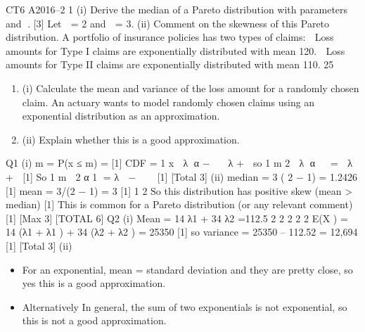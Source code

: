 \documentclass[a4paper,12pt]{article}
\begin{document}
CT6 A2016–2
1 (i) Derive the median of a Pareto distribution with parameters  and . [3]
Let  = 2 and  = 3.
(ii) Comment on the skewness of this Pareto distribution.
 A portfolio of insurance policies has two types of claims:
   Loss amounts for Type I claims are exponentially distributed with mean 120.
 Loss amounts for Type II claims are exponentially distributed with mean 110.
25%
\begin{enumerate}
\item (i) Calculate the mean and variance of the loss amount for a randomly chosen claim.
An actuary wants to model randomly chosen claims using an exponential distribution as an approximation.
\item (ii) Explain whether this is a good approximation.
\end{enumerate}

\newpage
Q1 (i) m = P(x ≤ m) =
  [1]
CDF = 1
x
 λ α −   λ + 
so 1
m 2
 λ α   =  λ + 
[1]
So
1
m  2 α 1 = λ  − 
 
[1]
[Total 3]
(ii) median = 3 ( 2 − 1) = 1.2426 [1]
mean = 3/(2 − 1) = 3 [1]
1
2
So this distribution has positive skew (mean > median) [1]
This is common for a Pareto distribution (or any relevant comment) [1]
[Max 3]
[TOTAL 6]
Q2 (i) Mean = 14 λ1 + 34 λ2 =112.5
2 2 2 2 2
E(X ) = 14 (λ1 + λ1 ) + 34 (λ2 + λ2 ) = 25350 [1]
so variance = 25350 – 112.52 = 12,694 [1]
[Total 3]
(ii) 
\begin{itemize}
\item For an exponential, mean = standard deviation and they are pretty close, so yes
this is a good approximation. 
\item Alternatively
In general, the sum of two exponentials is not exponential, so this is not a
good approximation. 
\end{itemize}
\end{document}
